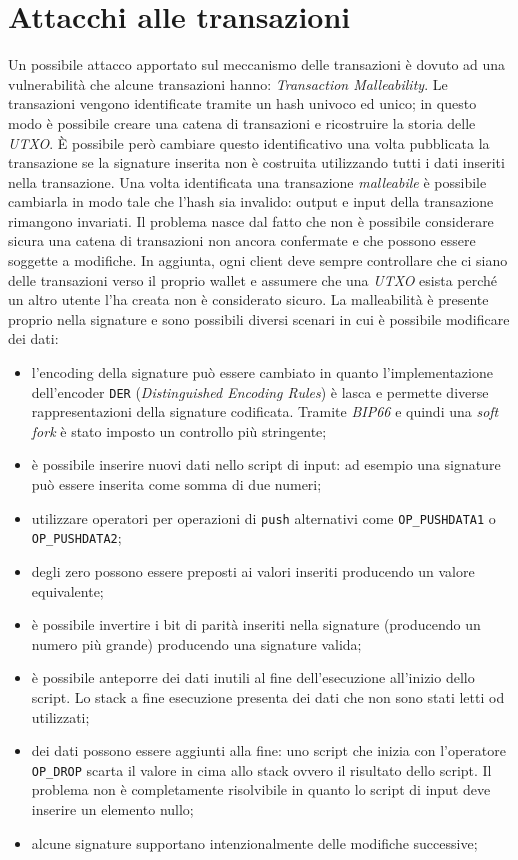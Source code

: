 \section{Attacchi alle transazioni}
Un possibile attacco apportato sul meccanismo delle transazioni è dovuto ad una vulnerabilità che alcune transazioni hanno: \textit{Transaction Malleability}.\newline
Le transazioni vengono identificate tramite un hash univoco ed unico; in questo modo è possibile creare una catena di transazioni e ricostruire la storia delle \textit{UTXO}. È possibile però cambiare questo identificativo una volta pubblicata la transazione se la signature inserita non è costruita utilizzando tutti i dati inseriti nella transazione. Una volta identificata una transazione \textit{malleabile} è possibile cambiarla in modo tale che l'hash sia invalido: output e input della transazione rimangono invariati. Il problema nasce dal fatto che non è possibile considerare sicura una catena di transazioni non ancora confermate e che possono essere soggette a modifiche. In aggiunta, ogni client deve sempre controllare che ci siano delle transazioni verso il proprio wallet e assumere che una \textit{UTXO} esista perché un altro utente l'ha creata non è considerato sicuro.\newline
La malleabilità è presente proprio nella signature e sono possibili diversi scenari in cui è possibile modificare dei dati:
\begin{itemize}
    \item l'encoding della signature può essere cambiato in quanto l'implementazione dell'encoder \texttt{DER} (\textit{Distinguished Encoding Rules}) è lasca e permette diverse rappresentazioni della signature codificata. Tramite \textit{BIP66} e quindi una \textit{soft fork} è stato imposto un controllo più stringente;
    \item è possibile inserire nuovi dati nello script di input: ad esempio una signature può essere inserita come somma di due numeri;
    \item utilizzare operatori per operazioni di \texttt{push} alternativi come \texttt{OP\_PUSHDATA1} o \texttt{OP\_PUSHDATA2};
    \item degli zero possono essere preposti ai valori inseriti producendo un valore equivalente;
    \item è possibile invertire i bit di parità inseriti nella signature (producendo un numero più grande) producendo una signature valida;
    \item è possibile anteporre dei dati inutili al fine dell'esecuzione all'inizio dello script. Lo stack a fine esecuzione presenta dei dati che non sono stati letti od utilizzati;
    \item dei dati possono essere aggiunti alla fine: uno script che inizia con l'operatore \texttt{OP\_DROP} scarta il valore in cima allo stack ovvero il risultato dello script. Il problema non è completamente risolvibile in quanto lo script di input deve inserire un elemento nullo;
    \item alcune signature supportano intenzionalmente delle modifiche successive;
\end{itemize}
